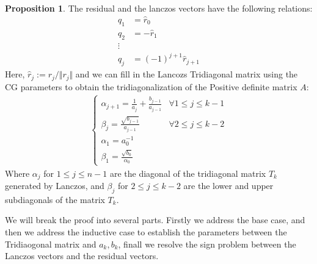 \documentclass[]{article}
\theoremstyle{definition}
\newtheorem{prop}{Proposition}[section]  %
\begin{document}
        \begin{prop}
            The residual and the lanczos vectors have the following relations: 
            \begin{align}
                q_1 &= \hat r_0\\
                q_2 &= -\hat r_1
                \\
                \vdots
                \\
                q_j &= (-1)^{j + 1}\hat r_{j + 1}
            \end{align}
            Here, $\hat{r}_j:= r_j/\Vert r_j\Vert$ and we can fill in the Lancozs Tridiagonal matrix using the CG parameters to obtain the tridiagonalization of the Positive definite matrix $A$: 
            \begin{align}
                \begin{cases}
                    \alpha_{j + 1} = \frac{1}{a_j} + \frac{b_{j - 1}}{a_{j - 1}}
                    & \forall 1 \le j \le k - 1
                    \\
                    \beta_{j} = \frac{\sqrt{b_{j - 1}}}{a_{j - 1}}
                    & \forall 2 \le j \le k - 2 
                    \\
                    \alpha_1 = a_0^{-1} & 
                    \\
                    \beta_1 = \frac{\sqrt{b_0}}{\alpha_0}
                \end{cases}
            \end{align}
            Where $\alpha_j$ for $1\le j \le n - 1$ are the diagonal of the tridiagonal matrix $T_k$ generated by Lanczos, and $\beta_j$ for $2\le j \le k - 2$ are the lower and upper subdiagonals of the matrix $T_k$. 
        \end{prop}
        We will break the proof into several parts. Firstly we address the base case, and then we address the inductive case to establish the parameters between the Tridiaogonal matrix and $a_k, b_k$, finall we resolve the sign problem between the Lanczos vectors and the residual vectors. 
\end{document}
